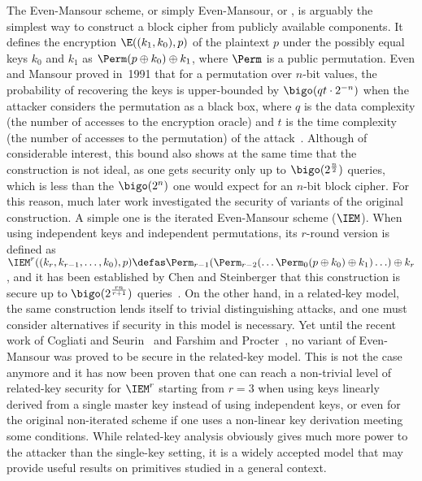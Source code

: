The Even-Mansour scheme, or simply Even-Mansour, or \EM, is arguably the simplest way to construct a block cipher from publicly available
components. It defines the encryption $\E((k_1, k_0), p)$ of the plaintext $p$ under the possibly equal keys $k_0$
and $k_1$ as $\Perm(p \oplus k_0) \oplus k_1$, where $\Perm$ is a public permutation. Even and Mansour proved
in~1991 that for a permutation over $n$-bit values, the probability of recovering the keys
is upper-bounded by $\bigo(qt \cdot 2^{-n})$ when the attacker considers the permutation as a black box,
where $q$ is the data complexity (the number of accesses to the encryption oracle) and $t$ is the time
complexity (the number of accesses to the permutation) of the attack~\cite{EM}. Although
of considerable interest, this bound also shows at the same time that the construction is not ideal,
as one gets security only up to $\bigo(2^\frac{n}{2})$ queries, which
is less than the $\bigo(2^n)$ one would expect for an $n$-bit block cipher. For this
reason, much later work investigated the security of variants of the original construction. A simple
one is the iterated Even-Mansour scheme ($\IEM$). When using independent keys and independent permutations,
its $r$-round version is defined as
$\IEM^r((k_r, k_{r-1}, \ldots, k_0), p) \defas \Perm_{r-1}(\Perm_{r-2}(\ldots\Perm_0\linebreak[1](p \oplus k_0) \oplus k_1)\ldots) \oplus k_r$,
and it has been established by Chen and Steinberger that this construction is secure up to $\bigo(2^\frac{rn}{r+1})$ queries~\cite{CS14}.
On the other hand, in a related-key model, the same construction lends itself to trivial
distinguishing attacks, and one must consider alternatives if security in this model is necessary.
Yet until the recent work of Cogliati and Seurin~\cite{CS15} and Farshim and Procter~\cite{FP14},
no variant of Even-Mansour was proved to be secure in the related-key model. This is not the case
anymore and it has now been proven that one can reach a non-trivial level of related-key security for $\IEM^r$
starting from $r = 3$ when using keys linearly derived from a single master key instead
of using independent keys, or even for the original non-iterated \EM scheme if one uses
a non-linear key derivation meeting some conditions.
While related-key analysis obviously gives much more power to the attacker than the
single-key setting, it is a widely accepted
model that may provide useful results on primitives studied in a general context.

